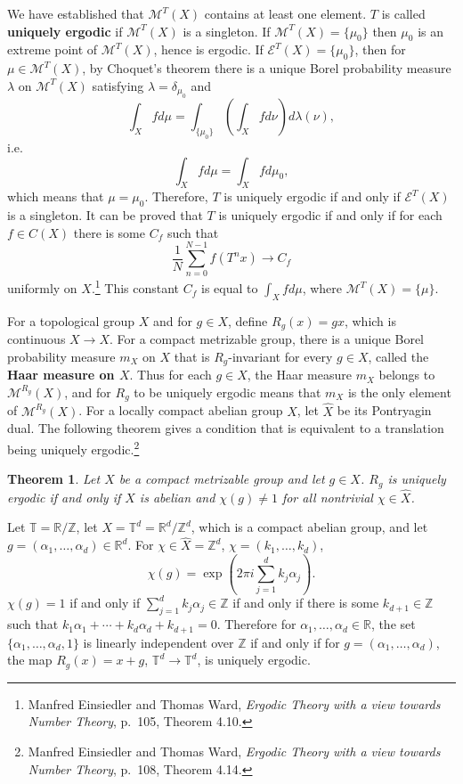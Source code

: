 \documentclass{article}
\newtheorem{theorem}{Theorem}
\theoremstyle{definition}
\begin{document}
We have established that $\mathscr{M}^T(X)$ contains at least one element.
$T$ is called \textbf{uniquely ergodic} if $\mathscr{M}^T(X)$ is a singleton. 
If $\mathscr{M}^T(X)=\{\mu_0\}$ then $\mu_0$ is an extreme point of
$\mathscr{M}^T(X)$, hence is ergodic. If $\mathscr{E}^T(X)=\{\mu_0\}$, then for 
$\mu \in \mathscr{M}^T(X)$, by Choquet's theorem there is a unique Borel probability
measure $\lambda$ on $\mathscr{M}^T(X)$ satisfying
$\lambda = \delta_{\mu_0}$ and
\[
\int_X f d\mu = \int_{\{\mu_0\}} \left( \int_X f d\nu\right) d\lambda(\nu),
\]
i.e.
\[
\int_X fd\mu = \int_X f d\mu_0,
\]
which means that $\mu = \mu_0$. Therefore, $T$ is uniquely ergodic if and only if $\mathscr{E}^T(X)$
is a singleton.
It can be proved that $T$ is uniquely ergodic if and only if for each
$f \in C(X)$ there is some $C_f$ such that
\[
\frac{1}{N} \sum_{n=0}^{N-1} f(T^n x) \to C_f
\]
uniformly on $X$.\footnote{Manfred Einsiedler and Thomas Ward, {\em Ergodic Theory with a view towards Number Theory},
p.~105, Theorem 4.10.}
This constant $C_f$ is equal to $\int_X f d\mu$, where $\mathscr{M}^T(X)=\{\mu\}$.

For a topological group $X$ and for $g \in X$, define $R_g(x) = gx$, which is continuous
$X \to X$. 
For a compact metrizable group, there is a unique Borel probability measure
$m_X$ on $X$ that is $R_g$-invariant for every $g \in X$, called the \textbf{Haar measure on $X$}.
Thus for each $g \in X$, the Haar measure $m_X$ belongs to $\mathscr{M}^{R_g}(X)$, and for
$R_g$ to be uniquely ergodic means that $m_X$ is the only element of $\mathscr{M}^{R_g}(X)$.
For a locally compact abelian group $X$, let $\widehat{X}$ be its Pontryagin dual.
The following theorem gives a condition that is equivalent to a translation being uniquely ergodic.\footnote{Manfred Einsiedler and Thomas Ward, {\em Ergodic Theory with a view towards Number Theory},
p.~108, Theorem 4.14.}


\begin{theorem}
Let $X$ be a compact metrizable group and let $g \in X$. $R_g$ is uniquely
ergodic if and only if $X$ is abelian and $\chi(g) \neq 1$ for all nontrivial $\chi \in \widehat{X}$.
\end{theorem}


Let $\mathbb{T} = \mathbb{R} / \mathbb{Z}$,  let
$X = \mathbb{T}^d = \mathbb{R}^d / \mathbb{Z}^d$, which is  a compact abelian group,
and let $g=(\alpha_1,\ldots,\alpha_d) \in \mathbb{R}^d$. 
For
$\chi \in \widehat{X} = \mathbb{Z}^d$, $\chi = (k_1,\ldots,k_d)$,
\[
\chi(g) = \exp\left(2\pi i \sum_{j=1}^d k_j \alpha_j \right).
\]
 $\chi(g)=1$ if and only if $\sum_{j=1}^d k_j \alpha_j  \in \mathbb{Z}$ if and only if there is some
 $k_{d+1} \in \mathbb{Z}$ such that $k_1\alpha_1 + \cdots + k_d\alpha_d + k_{d+1}=0$. 
 Therefore for $\alpha_1,\ldots,\alpha_d \in \mathbb{R}$, the set 
 $\{\alpha_1,\ldots,\alpha_d,1\}$ is linearly independent over $\mathbb{Z}$ if and only if
for $g=(\alpha_1,\ldots,\alpha_d)$, the map $R_g(x) = x+g$, $\mathbb{T}^d \to \mathbb{T}^d$,  is uniquely ergodic.
\end{document}
